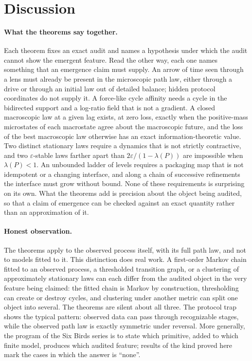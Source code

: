 \section{Discussion}\label{sec:discussion}

\paragraph{What the theorems say together.}
Each theorem fixes an exact audit and names a hypothesis under which the audit cannot show the emergent feature.
Read the other way, each one names something that an emergence claim must supply.
An arrow of time seen through a lens must already be present in the microscopic path law, either through a drive or through an initial law out of detailed balance; hidden protocol coordinates do not supply it.
A force-like cycle affinity needs a cycle in the bidirected support and a log-ratio field that is not a gradient.
A closed macroscopic law at a given lag exists, at zero loss, exactly when the positive-mass microstates of each macrostate agree about the macroscopic future, and the loss of the best macroscopic law otherwise has an exact information-theoretic value.
Two distinct stationary laws require a dynamics that is not strictly contractive, and two $\varepsilon$-stable laws farther apart than $2\varepsilon/(1-\lambda(P))$ are impossible when $\lambda(P)<1$.
An unbounded ladder of levels requires a packaging map that is not idempotent or a changing interface, and along a chain of successive refinements the interface must grow without bound.
None of these requirements is surprising on its own.
What the theorems add is precision about the object being audited, so that a claim of emergence can be checked against an exact quantity rather than an approximation of it.

\paragraph{Honest observation.}
The theorems apply to the observed process itself, with its full path law, and not to models fitted to it.
This distinction does real work.
A first-order Markov chain fitted to an observed process, a thresholded transition graph, or a clustering of approximately stationary laws can each differ from the audited object in the very feature being claimed: the fitted chain is Markov by construction, thresholding can create or destroy cycles, and clustering under another metric can split one object into several. The theorems are silent about all three.
The protocol trap shows the typical pattern: observed data can pass through recognizable stages, while the observed path law is exactly symmetric under reversal.
More generally, the program of the Six Birds series \citep{SB_FOUNDATIONS,SB_PROTOCOL_TRAP,SB_CAST} is to state which primitive, added to which finite model, produces which audited feature; results of the kind proved here mark the cases in which the answer is ``none''.

